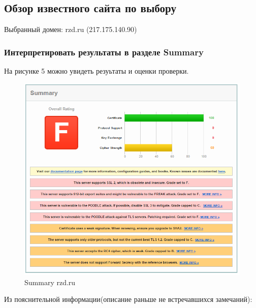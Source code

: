 \documentclass[11pt, a4paper]{article}		%
\begin{document}

\subsection{Обзор известного сайта по выбору}

Выбранный домен: rzd.ru (217.175.140.90)


\subsubsection{Интерпретировать результаты в разделе Summary}

На рисунке 5 можно увидеть резуьтаты и оценки проверки.


\begin{figure}[h!]
\centering
\includegraphics[scale=0.8]{res/summary_rzd}
\caption{Summary rzd.ru}
\end{figure}

Из пояснительной информации(описание раньше не встречавшихся замечаний):
\end{document}
